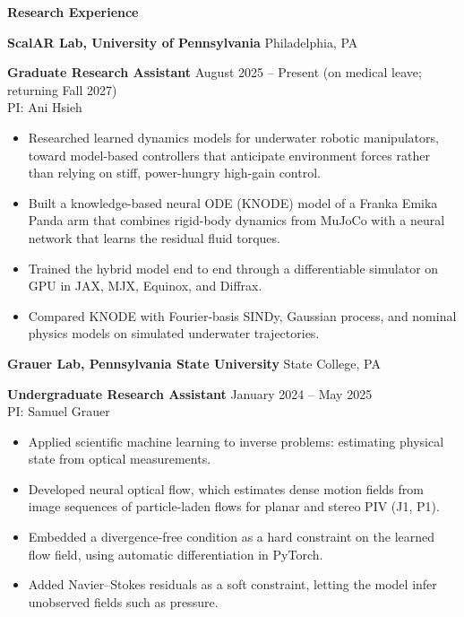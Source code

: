\begin{center}
    \textbf{Research Experience}
\end{center}
\textbf{ScalAR Lab, University of Pennsylvania} \hfill Philadelphia, PA

\textbf{Graduate Research Assistant} \hfill August 2025 -- Present (on medical leave; returning Fall 2027)\\
PI: Ani Hsieh
\begin{itemize}[noitemsep, topsep=0pt, partopsep=0pt, parsep=0pt]
    \item Researched learned dynamics models for underwater robotic manipulators, toward model-based controllers that anticipate environment forces rather than relying on stiff, power-hungry high-gain control.

    \item Built a knowledge-based neural ODE (KNODE) model of a Franka Emika Panda arm that combines rigid-body dynamics from MuJoCo with a neural network that learns the residual fluid torques.

    \item Trained the hybrid model end to end through a differentiable simulator on GPU in JAX, MJX, Equinox, and Diffrax.

    \item Compared KNODE with Fourier-basis SINDy, Gaussian process, and nominal physics models on simulated underwater trajectories.
\end{itemize}

\vspace{12pt}

\textbf{Grauer Lab, Pennsylvania State University} \hfill State College, PA

\textbf{Undergraduate Research Assistant} \hfill January 2024 -- May 2025\\
PI: Samuel Grauer
\begin{itemize}[noitemsep, topsep=0pt, partopsep=0pt, parsep=0pt]
    \item Applied scientific machine learning to inverse problems: estimating physical state from optical measurements.

    \item Developed neural optical flow, which estimates dense motion fields from image sequences of particle-laden flows for planar and stereo PIV (J1, P1).

    \item Embedded a divergence-free condition as a hard constraint on the learned flow field, using automatic differentiation in PyTorch.

    \item Added Navier--Stokes residuals as a soft constraint, letting the model infer unobserved fields such as pressure.
\end{itemize}

